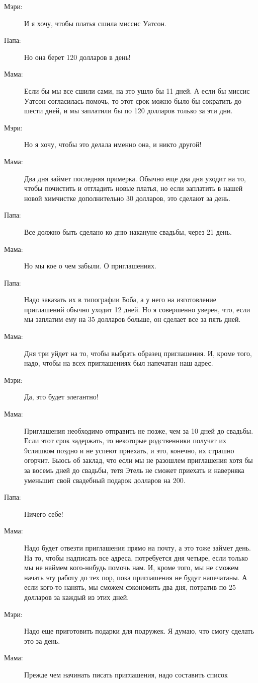 \documentclass[a4paper,12pt]{extarticle}
\begin{document}
\begin{description}
\item[Мэри:] И я хочу, чтобы платья сшила миссис Уатсон.
\item[Папа:] Но она берет 120 долларов в день!
\item[Мама:] Если бы мы все сшили сами, на это ушло бы 11 дней. А если бы
миссис Уатсон согласилась помочь, то этот срок можно было бы сократить до
шести дней, и мы заплатили бы по 120 долларов только за эти дни.
\item[Мэри:] Но я хочу, чтобы это делала именно она, и никто другой!
\item[Мама:] Два дня займет последняя примерка. Обычно еще два дня уходит на
то, чтобы почистить и отгладить новые платья, но если заплатить в нашей новой
химчистке дополнительно 30 долларов, это сделают за день.
\item[Папа:] Все должно быть сделано ко дню накануне свадьбы, через 21 день.
\item[Мама:] Но мы кое о чем забыли. О приглашениях.
\item[Папа:] Надо заказать их в типографии Боба, а у него на изготовление
приглашений обычно уходит 12 дней. Но я совершенно уверен, что, если мы
заплатим ему на 35 долларов больше, он сделает все за пять дней.
\item[Мама:] Дня три уйдет на то, чтобы выбрать образец приглашения. И, кроме
того, надо, чтобы на всех приглашениях был напечатан наш адрес.
\item[Мэри:] Да, это будет элегантно!
\item[Мама:] Приглашения необходимо отправить не позже, чем за 10 дней до
свадьбы. Если этот срок задержать, то некоторые родственники получат их
9слишком поздно и не успеют приехать, и это, конечно, их страшно огорчит.
Бьюсь об заклад, что если мы не разошлем приглашения хотя бы за восемь дней
до свадьбы, тетя Этель не сможет приехать и наверняка уменьшит свой
свадебный подарок долларов на 200.
\item[Папа:] Ничего себе!
\item[Мама:] Надо будет отвезти приглашения прямо на почту, а это тоже займет
день. На то, чтобы надписать все адреса, потребуется дня четыре, если только мы
не наймем кого-нибудь помочь нам. И, кроме того, мы не сможем начать эту
работу до тех пор, пока приглашения не будут напечатаны. А если кого-то нанять,
мы сможем сэкономить два дня, потратив по 25 долларов за каждый из этих дней.
\item[Мэри:] Надо еще приготовить подарки для подружек. Я думаю, что смогу
сделать это за день.
\item[Мама:] Прежде чем начинать писать приглашения, надо составить список

\end{description}
\end{document}
